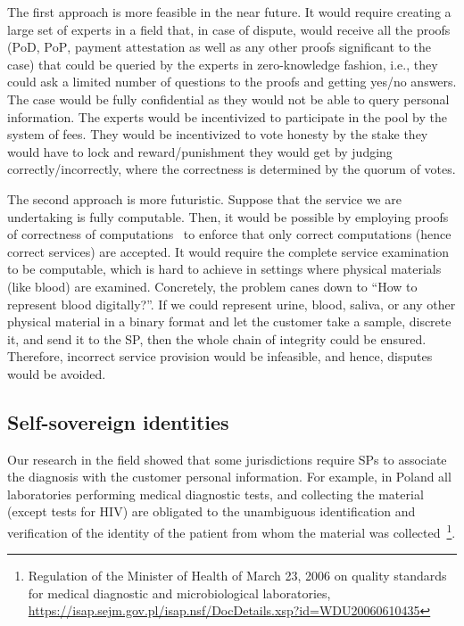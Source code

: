 \documentclass{ieeeaccess}
\begin{document}
The first approach is more feasible in the near future. It would require creating a large set of experts in a field that, in case of dispute, would receive all the proofs ($\mathrm{PoD}$, $\mathrm{PoP}$, payment $\mathrm{attestation}$ as well as any other proofs significant to the case) that could be queried by the experts in zero-knowledge fashion, i.e., they could ask a limited number of questions to the proofs and getting yes/no answers. The case would be fully confidential as they would not be able to query personal information. The experts would be incentivized to participate in the pool by the system of fees. They would be incentivized to vote honesty by the stake they would have to lock and reward/punishment they would get by judging correctly/incorrectly, where the correctness is determined by the quorum of votes.

The second approach is more futuristic. Suppose that the service we are undertaking is fully computable. Then, it would be possible by employing proofs of correctness of computations~\cite{ben-sassonSNARKsVerifyingProgram2013} to enforce that only correct computations (hence correct services) are accepted. It would require the complete service examination to be computable, which is hard to achieve in settings where physical materials (like blood) are examined. Concretely, the problem canes down to ``How to represent blood digitally?''. If we could represent urine, blood, saliva, or any other physical material in a binary format and let the customer take a sample, discrete it, and send it to the SP, then the whole chain of integrity could be ensured. Therefore, incorrect service provision would be infeasible, and hence, disputes would be avoided.

\subsection{Self-sovereign identities}
Our research in the field showed that some jurisdictions require SPs to associate the diagnosis with the customer personal information. For example, in Poland all laboratories performing medical diagnostic tests, and collecting the material (except tests for HIV) are obligated to the unambiguous identification and verification of the identity of the patient from whom the material was collected~\footnote{Regulation of the Minister of Health of March 23, 2006 on quality standards for medical diagnostic and microbiological laboratories, \url{https://isap.sejm.gov.pl/isap.nsf/DocDetails.xsp?id=WDU20060610435}}.
\end{document}
